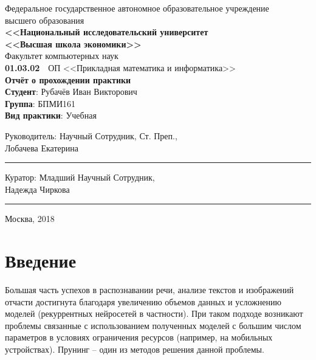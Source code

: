 \documentclass[12pt]{article}
\begin{document}
\begin{titlepage}
  \center
  Федеральное государственное автономное образовательное учреждение\\
  высшего образования \\[.2cm]
  \textbf{\large <<Национальный исследовательский университет\\
    <<Высшая школа экономики>>}\\[.2cm]
  Факультет компьютерных наук\\[.2cm]
  \textbf{01.03.02}\ \  ОП <<Прикладная математика и информатика>>\\[4cm]
  \textbf{\LARGE Отчёт о прохождении практики}\\[2cm]
  {\flushleft
  \textbf{Студент}: Рубачёв Иван Викторович \\
  \textbf{Группа}: БПМИ161 \\
  \textbf{Вид практики}: Учебная\\[5.7cm]}

  \begin{multicols}{3}
    {\flushleft \scriptsize Руководитель:\vfill\columnbreak}
    {\flushleft \scriptsize Научный Сотрудник, Ст. Преп., \\[0.1em]}
    {\flushleft \scriptsize Лобачева Екатерина}
    {\vskip5mm\rule{5cm}{0.15mm}}
  \end{multicols}
  \begin{multicols}{3}
    {\flushleft \scriptsize Куратор:\vfill\columnbreak}
    {\flushleft \scriptsize Младший Научный Сотрудник, \\}
    {\flushleft \scriptsize Надежда Чиркова}
    {\vskip5mm\rule{5cm}{0.15mm}}
  \end{multicols}
  Москва, 2018
\end{titlepage}

{
\hypersetup{linkcolor=black}
\tableofcontents
}

\newpage

\section*{Введение}
%
Большая часть успехов в распознавании речи, анализе текстов и изображений отчасти достигнута благодаря
увеличению объемов данных и усложнению моделей (рекуррентных нейросетей в частности). При таком подходе
возникают проблемы связанные с использованием полученных моделей с большим числом параметров в условиях ограничения ресурсов
(например, на мобильных устройствах). Прунинг -- один из методов решения данной проблемы.
\end{document}

